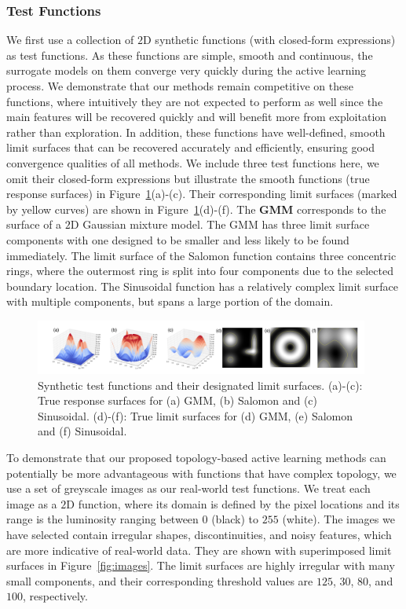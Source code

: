 \subsubsection{Test Functions}
We first use a collection of $2$D synthetic functions (with closed-form expressions) as test functions.
%
As these functions are simple, smooth and continuous, the surrogate models on them converge very quickly during the active learning process.
%
We demonstrate that our methods remain competitive on these functions, where intuitively they are not expected to perform as well since the main features will be recovered quickly and will benefit more from exploitation rather than exploration.
%
In addition, these functions have well-defined, smooth limit surfaces that can be recovered accurately and efficiently, ensuring good convergence qualities of all methods.
%
We include three test functions here, we omit their closed-form expressions but illustrate the smooth functions (true response surfaces) in Figure~\ref{fig:synthetic}(a)-(c).
%
Their corresponding limit surfaces (marked by yellow curves) are shown in Figure~\ref{fig:synthetic}(d)-(f).
%
The \textbf{GMM} corresponds to the surface of a $2$D Gaussian mixture model.
%
The GMM has three limit surface components with one designed to be smaller and less likely to be found immediately.
%
The limit surface of the Salomon function contains three concentric rings, where the outermost ring is split into four components due to the selected boundary location.
%
The Sinusoidal function has a relatively complex limit surface with multiple components, but spans a large portion of the domain.

\begin{figure}[!ht]
\centering
\includegraphics[width=0.98\textwidth]{figs/chap5/synthetic}
\caption{Synthetic test functions and their designated limit surfaces.
(a)-(c): True response surfaces for (a) GMM, (b) Salomon and (c) Sinusoidal.
(d)-(f): True limit surfaces for (d) GMM, (e) Salomon and (f) Sinusoidal.}
\label{fig:synthetic}
\end{figure}

To demonstrate that our proposed topology-based active learning methods can potentially be more advantageous with functions that have complex topology, we use a set of greyscale images as our real-world test functions.
%
We treat each image as a $2$D function, where its domain is defined by the pixel locations and its range is the luminosity ranging between $0$ (black) to $255$ (white).
%
The images we have selected contain irregular shapes, discontinuities, and noisy features, which are more indicative of real-world data.
%
They are shown with superimposed limit surfaces in Figure~\ref{fig:images}.
%
The limit surfaces are highly irregular with many small components, and their corresponding threshold values are $125$, $30$, $80$, and $100$, respectively.

